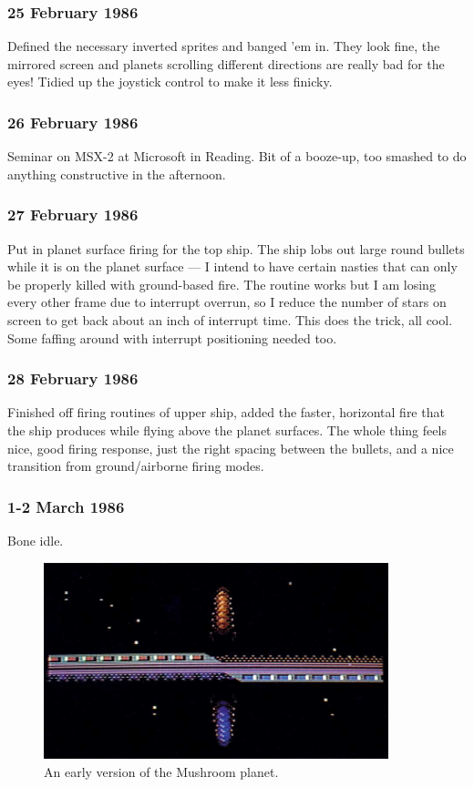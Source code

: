 \subsubsection{25 February 1986}
Defined the necessary inverted sprites and banged 'em in. They look fine, the mirrored screen and planets scrolling different directions are really bad for the eyes! Tidied up the joystick control to make it less finicky.

\subsubsection{26 February 1986}
Seminar on MSX-2 at Microsoft in Reading. Bit of a booze-up, too smashed to do anything constructive in the afternoon.

\subsubsection{27 February 1986}
Put in planet surface firing for the top ship. The ship lobs out large round bullets while it is on the planet surface — I intend to have certain nasties that can only be properly killed with ground-based fire. The routine works but I am losing every other frame due to interrupt overrun, so I reduce the number of stars on screen to get back about an inch of interrupt time. This does the trick, all cool. Some faffing around with interrupt positioning needed too.

\subsubsection{28 February 1986}
Finished off firing routines of upper ship, added the faster, horizontal fire that the ship produces while flying above the planet surfaces. The whole thing feels nice, good firing response, just the right spacing between the bullets, and a nice transition from ground/airborne firing modes.

\subsubsection{1-2 March 1986}
Bone idle.

\begin{figure}[H]
    \centering
      \includegraphics[width=10cm]{src/diary/zzap13_pic3.jpg}%
\caption{An early version of the Mushroom planet.}
\end{figure}


